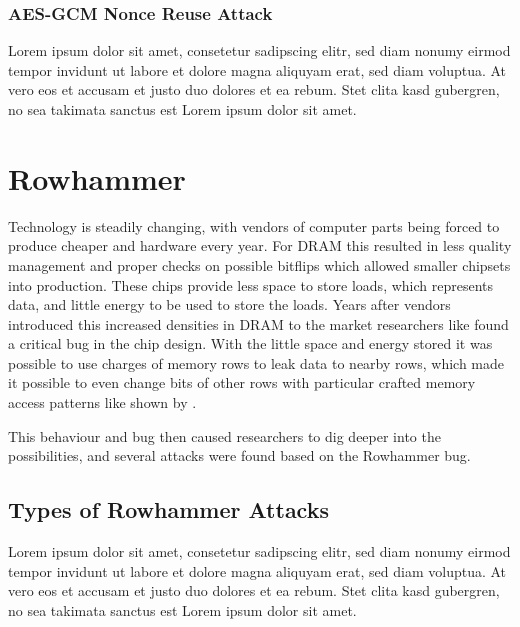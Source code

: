 \subsubsection{AES-GCM Nonce Reuse Attack}

Lorem ipsum dolor sit amet, consetetur sadipscing elitr, sed diam nonumy eirmod
tempor invidunt ut labore et dolore magna aliquyam erat, sed diam voluptua. At
vero eos et accusam et justo duo dolores et ea rebum. Stet clita kasd gubergren,
no sea takimata sanctus est Lorem ipsum dolor sit amet.

\section{Rowhammer}

Technology is steadily changing, with vendors of computer parts being forced to
produce cheaper and hardware every year. For DRAM this resulted in less quality
management and proper checks on possible bitflips which allowed smaller chipsets
into production. These chips provide less space to store loads, which represents
data, and little energy to be used to store the loads. Years after vendors
introduced this increased densities in DRAM to the market researchers like
 found a critical bug in the chip design. With the
little space and energy stored it was possible to use charges of memory rows to
leak data to nearby rows, which made it possible to even change bits of other
rows with particular crafted memory access patterns like shown by
.

This behaviour and bug then caused researchers to dig deeper into the
possibilities, and several attacks were found based on the Rowhammer bug.

\subsection{Types of Rowhammer Attacks}

Lorem ipsum dolor sit amet, consetetur sadipscing elitr, sed diam nonumy eirmod
tempor invidunt ut labore et dolore magna aliquyam erat, sed diam voluptua. At
vero eos et accusam et justo duo dolores et ea rebum. Stet clita kasd gubergren,
no sea takimata sanctus est Lorem ipsum dolor sit amet.

